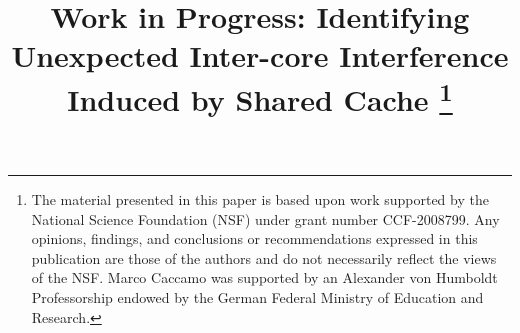 \documentclass[10pt,conference]{IEEEtran}
\begin{document}
\newcommand\schim{SchIM\xspace}
\newcommand\schimL{Scheduler In-the-Middle\xspace}
\newcommand\schiml{scheduler in-the-middle\xspace}
\newcommand\axiin[1]{$\texttt{HPM}_{#1}$\xspace}
\newcommand\axiout[1]{$\texttt{HPS}_{#1}$\xspace}
\newcommand\axiconf[1]{$\texttt{LPM}_{#1}$\xspace}

\newcommand{\fig}[1]{Fig.~\ref{#1}}

\newcommand*\circledfig[2]{Fig.~\ref{#1}\tikz[baseline=0pt]{\node[anchor=south west,red,shape=circle,draw,inner sep=1pt] (char) {\scriptsize#2};}}

\newcommand*\circled[1]{\tikz[baseline=0pt]{\node[anchor=south west,red,shape=circle,draw,inner sep=1pt] (char) {\scriptsize#1};}}

\title{
    Work in Progress: Identifying Unexpected Inter-core Interference Induced by Shared Cache
    \thanks{
        The material presented in this paper is based upon work supported by the National Science Foundation (NSF) under grant number CCF-2008799. Any opinions, findings, and conclusions or recommendations expressed in this publication are those of the authors and do not necessarily reflect the views of the NSF.
        Marco Caccamo was supported by an Alexander von Humboldt Professorship endowed by the German Federal Ministry of Education and Research.
    }
}

\author{


}
\end{document}
